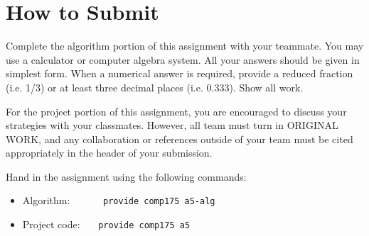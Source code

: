 \documentclass[10pt,twocolumn]{article}
\begin{document}
\section{How to Submit}					
Complete the algorithm portion of this assignment with your teammate. You may use a calculator or computer algebra system. All your answers should be given in simplest form. When a numerical answer is required, provide a reduced fraction (i.e. 1/3) or at least three decimal places (i.e. 0.333).  Show all work.

For the project portion of this assignment, you are encouraged to discuss your strategies with your classmates. However, all team must turn in ORIGINAL WORK, and any collaboration or references outside of your team must be cited appropriately in the header of your submission.

Hand in the assignment using the following commands:
\begin{itemize}
\item Algorithm:  \ \ \ \ \ \ {\tt provide comp175 a5-alg}
\item Project code: \ \ \ {\tt provide comp175 a5}\\
\end{itemize}
\end{document}
